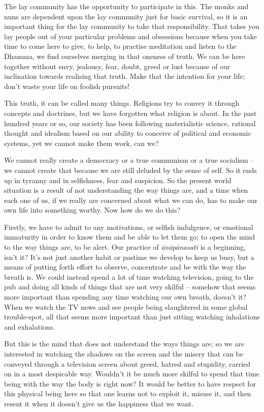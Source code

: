The lay community has the opportunity to participate in this. The monks and nuns are dependent upon the lay community just for basic survival, so it is an important thing for the lay community to take that responsibility. That takes you lay people out of your particular problems and obsessions because when you take time to come here to give, to help, to practise meditation and listen to the Dhamma, we find ourselves merging in that oneness of truth. We can be here together without envy, jealousy, fear, doubt, greed or lust because of our inclination towards realising that truth. Make that the intention for your life; don't waste your life on foolish pursuits!

This truth, it can be called many things. Religions try to convey it through concepts and doctrines, but we have forgotten what religion is about. In the past hundred years or so, our society has been following materialistic science, rational thought and idealism based on our ability to conceive of political and economic systems, yet we cannot make them work, can we?

We cannot really create a democracy or a true communism or a true socialism -- we cannot create that because we are still deluded by the sense of self. So it ends up in tyranny and in selfishness, fear and suspicion. So the present world situation is a result of not understanding the way things are, and a time when each one of us, if we really are concerned about what we can do, has to make our own life into something worthy. Now how do we do this?

Firstly, we have to admit to any motivations, or selfish indulgence, or emotional immaturity in order to know them and be able to let them go; to open the mind to the way things are, to be alert. Our practice of \textit{ānāpānasati} is a beginning, isn't it? It's not just another habit or pastime we develop to keep us busy, but a means of putting forth effort to observe, concentrate and be with the way the breath is. We could instead spend a lot of time watching television, going to the pub and doing all kinds of things that are not very skilful -- somehow that seems more important than spending any time watching our own breath, doesn't it? When we watch the TV news and see people being slaughtered in some global trouble-spot, all that seems more important than just sitting watching inhalations and exhalations.

But this is the mind that does not understand the ways things are; so we are interested in watching the shadows on the screen and the misery that can be conveyed through a television screen about greed, hatred and stupidity, carried on in a most despicable way. Wouldn't it be much more skilful to spend that time being with the way the body is right now? It would be better to have respect for this physical being here so that one learns not to exploit it, misuse it, and then resent it when it doesn't give us the happiness that we want.

